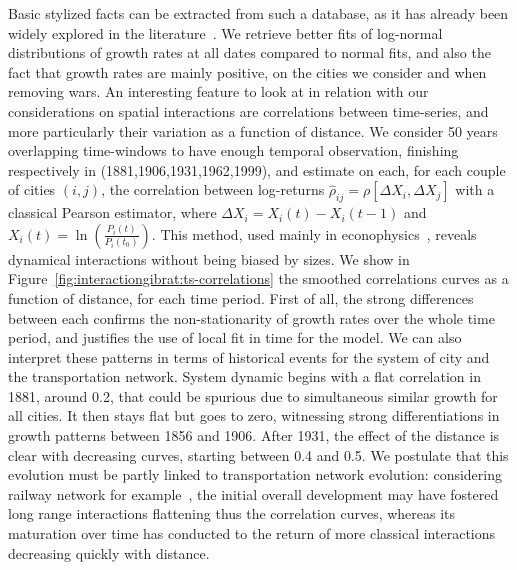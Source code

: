 Basic stylized facts can be extracted from such a database, as it has already been widely explored in the literature~\cite{guerin1990150}. We retrieve better fits of log-normal distributions of growth rates at all dates compared to normal fits, and also the fact that growth rates are mainly positive, on the cities we consider and when removing wars. An interesting feature to look at in relation with our considerations on spatial interactions are correlations between time-series, and more particularly their variation as a function of distance. We consider 50 years overlapping time-windows to have enough temporal observation, finishing respectively in (1881,1906,1931,1962,1999), and estimate on each, for each couple of cities $(i,j)$, the correlation between log-returns $\hat{\rho}_{ij}=\rho\left[\Delta X_i, \Delta X_j\right]$ with a classical Pearson estimator, where $\Delta X_i = X_i(t) - X_i(t-1)$ and $X_i(t) = \ln\left(\frac{P_i(t)}{P_i(t_0)}\right)$. This method, used mainly in econophysics~\citep{mantegna1999introduction}, reveals dynamical interactions without being biased by sizes. We show in Figure~\ref{fig:interactiongibrat:ts-correlations} the smoothed correlations curves as a function of distance, for each time period. First of all, the strong differences between each confirms the non-stationarity of growth rates over the whole time period, and justifies the use of local fit in time for the model. We can also interpret these patterns in terms of historical events for the system of city and the transportation network. System dynamic begins with a flat correlation in 1881, around 0.2, that could be spurious due to simultaneous similar growth for all cities. It then stays flat but goes to zero, witnessing strong differentiations in growth patterns between 1856 and 1906. After 1931, the effect of the distance is clear with decreasing curves, starting between 0.4 and 0.5. We postulate that this evolution must be partly linked to transportation network evolution: considering railway network for example~\citep{thevenin2013mapping}, the initial overall development may have fostered long range interactions flattening thus the correlation curves, whereas its maturation over time has conducted to the return of more classical interactions decreasing quickly with distance.


